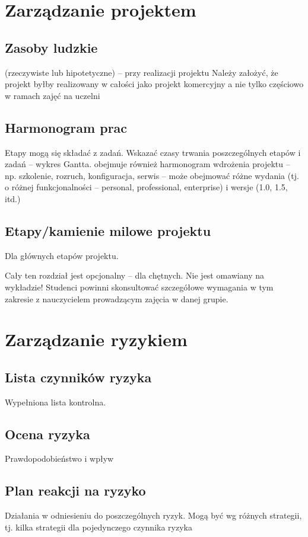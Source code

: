 \documentclass[a4paper,12pt]{article}
\begin{document}
\newpage

\section{Zarządzanie projektem}
\subsection{Zasoby ludzkie}
(rzeczywiste lub hipotetyczne) – przy realizacji projektu
Należy założyć, że projekt byłby realizowany w całości jako projekt komercyjny a nie tylko częściowo w ramach zajęć na uczelni


\subsection{Harmonogram prac}
Etapy mogą się składać z zadań.
Wskazać czasy trwania poszczególnych etapów i zadań – wykres Gantta.
obejmuje również harmonogram wdrożenia projektu – np. szkolenie, rozruch, konfiguracja, serwis – może obejmować różne wydania (tj. o różnej funkcjonalności – personal, professional, enterprise) i wersje (1.0, 1.5, itd.)

\subsection{Etapy/kamienie milowe projektu}

Dla głównych etapów projektu.


Cały ten rozdział jest opcjonalny – dla chętnych. Nie jest omawiany na wykładzie!
Studenci powinni skonsultować szczegółowe wymagania w tym zakresie z nauczycielem prowadzącym zajęcia w danej grupie.

\newpage

\section{Zarządzanie ryzykiem}
\subsection{Lista czynników ryzyka}
Wypełniona lista kontrolna.

\subsection{Ocena ryzyka}
Prawdopodobieństwo i wpływ

\subsection{Plan reakcji na ryzyko}
Działania w odniesieniu do poszczególnych ryzyk.
Mogą być wg różnych strategii, tj. kilka strategii dla pojedynczego czynnika ryzyka 
\end{document}
